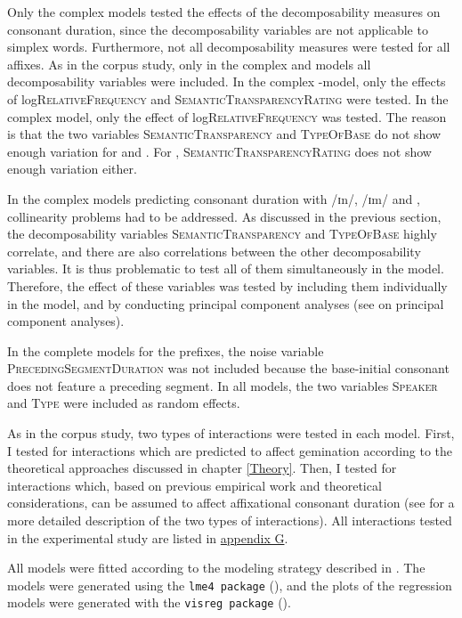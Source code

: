 Only the complex models tested the effects of the decomposability measures on consonant duration, since the decomposability variables are not applicable to simplex words.
Furthermore, not all decomposability measures were tested for all affixes. As in the corpus study, only in the complex   and models all decomposability variables were included. In the complex -model, only the effects of log\textsc{RelativeFrequency} and \textsc{SemanticTransparencyRating} were tested. In the complex model, only the effect of log\textsc{RelativeFrequency} was tested. The reason is that the two variables  \textsc{SemanticTransparency} and \textsc{TypeOfBase} do not show enough variation for  and . For , \textsc{SemanticTransparencyRating} does not show enough variation either.


In the complex models predicting consonant duration with /ɪn/, /ɪm/ and , collinearity problems had to be addressed. As discussed in the previous section, the decomposability variables \textsc{SemanticTransparency} and \textsc{TypeOfBase} highly correlate, and there are also correlations between the other decomposability variables. It is thus problematic to test all of them simultaneously in the model. Therefore, the effect of these variables was tested by including them individually in the model, and by conducting principal component analyses (see  on principal component analyses). 

In the complete models for the prefixes, the noise variable \textsc{PrecedingSegmentDuration} was not included because the base-initial consonant does not feature a preceding segment. In all models, the two variables \textsc{Speaker} and \textsc{Type} were included as random effects.


As in the corpus study, two types of interactions were tested in each model. First, I tested for interactions which are predicted to affect gemination according to the theoretical approaches discussed in chapter \ref{Theory}. Then, I tested for interactions which, based on previous empirical work and theoretical considerations, can be assumed to affect affixational consonant duration  (see  for a more detailed description of the two types of interactions). 
 All interactions tested in the experimental study are listed in \hyperref[Appendix G Summaries of tested interactions in experimental study]{appendix G}.

All models were fitted according to the modeling strategy described in .  
The models were generated using the \texttt{lme4 package} (\citealt{Bates.2014}), and the plots of the regression models were generated with the \texttt{visreg package} (\citealt{Breheny.2015}). 

